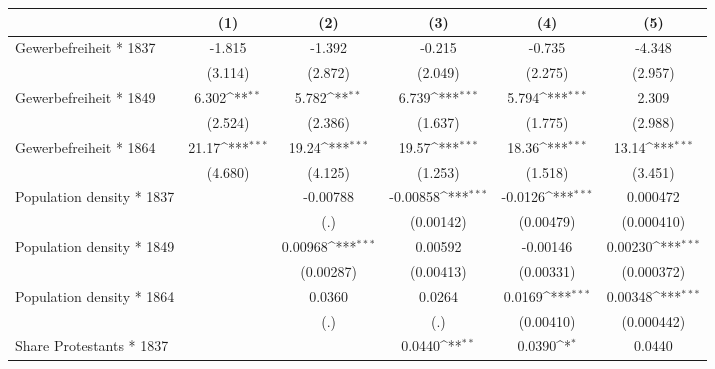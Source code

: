 {
\def\sym#1{\ifmmode^{#1}\else\(^{#1}\)\fi}
\begin{tabular}{l*{5}{c}}
\hline\hline
                    &\multicolumn{1}{c}{(1)}         &\multicolumn{1}{c}{(2)}         &\multicolumn{1}{c}{(3)}         &\multicolumn{1}{c}{(4)}         &\multicolumn{1}{c}{(5)}         \\
\hline
Gewerbefreiheit * 1837&      -1.815         &      -1.392         &      -0.215         &      -0.735         &      -4.348         \\
                    &     (3.114)         &     (2.872)         &     (2.049)         &     (2.275)         &     (2.957)         \\
Gewerbefreiheit * 1849&       6.302\sym{**} &       5.782\sym{**} &       6.739\sym{***}&       5.794\sym{***}&       2.309         \\
                    &     (2.524)         &     (2.386)         &     (1.637)         &     (1.775)         &     (2.988)         \\
Gewerbefreiheit * 1864&       21.17\sym{***}&       19.24\sym{***}&       19.57\sym{***}&       18.36\sym{***}&       13.14\sym{***}\\
                    &     (4.680)         &     (4.125)         &     (1.253)         &     (1.518)         &     (3.451)         \\
Population density * 1837&                     &    -0.00788         &    -0.00858\sym{***}&     -0.0126\sym{***}&    0.000472         \\
                    &                     &         (.)         &   (0.00142)         &   (0.00479)         &  (0.000410)         \\
Population density * 1849&                     &     0.00968\sym{***}&     0.00592         &    -0.00146         &     0.00230\sym{***}\\
                    &                     &   (0.00287)         &   (0.00413)         &   (0.00331)         &  (0.000372)         \\
Population density * 1864&                     &      0.0360         &      0.0264         &      0.0169\sym{***}&     0.00348\sym{***}\\
                    &                     &         (.)         &         (.)         &   (0.00410)         &  (0.000442)         \\
Share Protestants * 1837&                     &                     &      0.0440\sym{**} &      0.0390\sym{*}  &      0.0440         \\

\end{tabular}}
